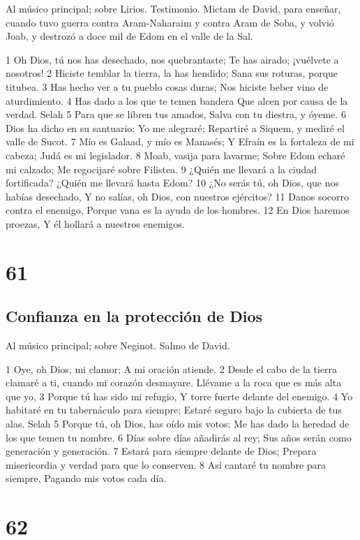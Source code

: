 Al músico principal; sobre Lirios. Testimonio. Mictam de David, para enseñar, cuando tuvo guerra contra Aram-Naharaim y contra Aram de Soba, y volvió Joab, y destrozó a doce mil de Edom en el valle de la Sal.

1 Oh Dios, tú nos has desechado, nos quebrantaste;
Te has airado; ¡vuélvete a nosotros!
2 Hiciste temblar la tierra, la has hendido;
Sana sus roturas, porque titubea.
3 Has hecho ver a tu pueblo cosas duras;
Nos hiciste beber vino de aturdimiento.
4 Has dado a los que te temen bandera
Que alcen por causa de la verdad. Selah
5 Para que se libren tus amados,
Salva con tu diestra, y óyeme.
6 Dios ha dicho en su santuario: Yo me alegraré;
Repartiré a Siquem, y mediré el valle de Sucot.
7 Mío es Galaad, y mío es Manasés;
Y Efraín es la fortaleza de mi cabeza;
Judá es mi legislador.
8 Moab, vasija para lavarme;
Sobre Edom echaré mi calzado;
Me regocijaré sobre Filistea.
9 ¿Quién me llevará a la ciudad fortificada?
¿Quién me llevará hasta Edom?
10 ¿No serás tú, oh Dios, que nos habías desechado,
Y no salías, oh Dios, con nuestros ejércitos?
11 Danos socorro contra el enemigo,
Porque vana es la ayuda de los hombres.
12 En Dios haremos proezas,
Y él hollará a nuestros enemigos.

\chapter{61}

\section*{Confianza en la protección de Dios}

Al músico principal; sobre Neginot. Salmo de David.

1 Oye, oh Dios, mi clamor;
A mi oración atiende.
2 Desde el cabo de la tierra clamaré a ti, cuando mi corazón desmayare.
Llévame a la roca que es más alta que yo,
3 Porque tú has sido mi refugio,
Y torre fuerte delante del enemigo.
4 Yo habitaré en tu tabernáculo para siempre;
Estaré seguro bajo la cubierta de tus alas. Selah
5 Porque tú, oh Dios, has oído mis votos;
Me has dado la heredad de los que temen tu nombre.
6 Días sobre días añadirás al rey;
Sus años serán como generación y generación.
7 Estará para siempre delante de Dios;
Prepara misericordia y verdad para que lo conserven.
8 Así cantaré tu nombre para siempre,
Pagando mis votos cada día.

\chapter{62}


